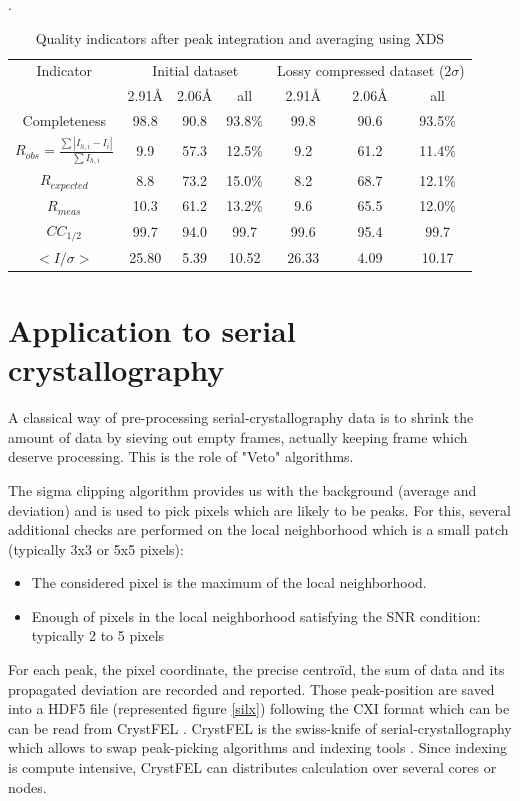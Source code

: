 \documentclass[preprint]{iucr}              %
\begin{document}
\begin{table}
\label{xds_summary}
\caption{Quality indicators after peak integration and averaging using XDS \cite{xds}}.
\begin{tabular}{|c|c c c|c c c|} 
\hline
Indicator & \multicolumn{3}{c|}{Initial dataset} & \multicolumn{3}{c|}{Lossy compressed dataset ($2\sigma$)} \\ 
          & 2.91\AA & 2.06\AA & all & 2.91\AA & 2.06\AA & all \\
\hline
Completeness                                        & 98.8& 90.8 & 93.8\% & 99.8& 90.6 & 93.5\% \\ 
$R_{obs}=\frac{\sum |I_{h,i}-I_{i}|}{\sum I_{h,i}}$ & 9.9 & 57.3& 12.5\% & 9.2 & 61.2&  11.4\%\\ 
$R_{expected}$                                      & 8.8 & 73.2& 15.0\% & 8.2 & 68.7 &  12.1\%\\
$R_{meas}$ \cite{Rmeas}  &10.3 &61.2& 13.2\% & 9.6 & 65.5 & 12.0\%\\
$CC_{1/2}$ \cite{cc1/2}  & 99.7 &94.0 & 99.7   & 99.6 & 95.4 & 99.7  \\
$<I/\sigma>$               & 25.80 & 5.39 & 10.52  & 26.33& 4.09 & 10.17 \\
\hline
\end{tabular}
\end{table}


\section{Application to serial crystallography}
A classical way of pre-processing serial-crystallography data is to shrink the amount of data by sieving out empty frames, actually keeping frame which deserve processing. 
This is the role of "Veto" algorithms.

The sigma clipping algorithm provides us with the background (average and deviation) and is used to pick pixels which are likely to be peaks. 
For this,  several additional checks are performed on the local neighborhood which is a small patch (typically 3x3 or 5x5 pixels):
\begin{itemize}
\item The considered pixel is the maximum of the local neighborhood.
\item Enough of pixels in the local neighborhood satisfying the SNR condition: typically 2 to 5 pixels
\end{itemize}

For each peak, the pixel coordinate, the precise centroïd, the sum of data and its propagated deviation are recorded and reported. 
Those peak-position are saved into a HDF5 file (represented figure \ref{silx}) following the CXI format \cite{cxi} which can be can be read from CrystFEL \cite{CrystFEL}.
CrystFEL is the swiss-knife of serial-crystallography which allows to swap peak-picking algorithms \cite{zaefferer, Cheetah2014, robustpeakfinder} and indexing tools \cite{xds, mosflm, taketwo, xgandalf, pinkindexer}.
Since indexing is compute intensive, CrystFEL can distributes calculation over several cores or nodes.
\end{document}

